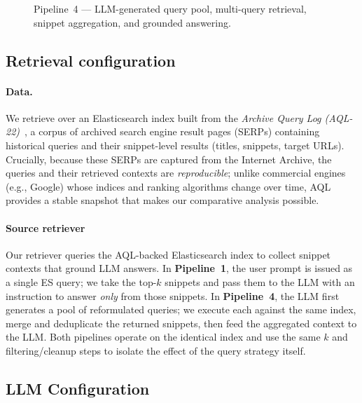 \documentclass[manuscript,screen]{acmart}
\begin{document}
\begin{CCSXML}
\begin{figure}[H]
{%
		}
		\caption{Pipeline~4 — LLM-generated query pool, multi-query retrieval, snippet aggregation, and grounded answering.}
		\label{fig:pipeline4}
	\end{figure}



	\subsection{Retrieval configuration}
	\label{subsec:retrieval-config}
	
	\paragraph{Data.}
	We retrieve over an Elasticsearch index built from the \emph{Archive Query Log (AQL-22)}~\citep{reimer:2023}, a corpus of archived search engine result pages (SERPs) containing historical queries and their snippet-level results (titles, snippets, target URLs). Crucially, because these SERPs are captured from the Internet Archive, the queries and their retrieved contexts are \emph{reproducible}; unlike commercial engines (e.g., Google) whose indices and ranking algorithms change over time, AQL provides a stable snapshot that makes our comparative analysis possible.
	
	\paragraph{Source retriever}
	Our retriever queries the AQL-backed Elasticsearch index to collect snippet contexts that ground LLM answers. In \textbf{Pipeline~1}, the user prompt is issued as a single ES query; we take the top-$k$ snippets and pass them to the LLM with an instruction to answer \emph{only} from those snippets. In \textbf{Pipeline~4}, the LLM first generates a pool of reformulated queries; we execute each against the same index, merge and deduplicate the returned snippets, then feed the aggregated context to the LLM. Both pipelines operate on the identical index and use the same $k$ and filtering/cleanup steps to isolate the effect of the query strategy itself.
	
	\subsection{LLM Configuration}
	\label{subsec:llm-config}
	

\end{CCSXML}
\end{document}
